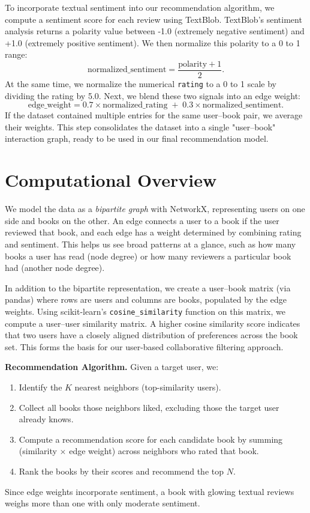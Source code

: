 \documentclass[12pt]{article}
\begin{document}
To incorporate textual sentiment into our recommendation algorithm, we compute a sentiment score for each review using TextBlob. TextBlob's sentiment analysis returns a polarity value between -1.0 (extremely negative sentiment) and +1.0 (extremely positive sentiment). We then normalize this polarity to a 0 to 1 range:
\[
\text{normalized\_sentiment} = \frac{\text{polarity} + 1}{2}.
\]
At the same time, we normalize the numerical \texttt{rating} to a 0 to 1 scale by dividing the rating by 5.0. Next, we blend these two signals into an edge weight:
\[
\text{edge\_weight} = 0.7 \times \text{normalized\_rating} \;+\; 0.3 \times \text{normalized\_sentiment}.
\]
If the dataset contained multiple entries for the same user--book pair, we average their weights. This step consolidates the dataset into a single "user--book" interaction graph, ready to be used in our final recommendation model.

\section{Computational Overview}

We model the data as a \textit{bipartite graph} with NetworkX, representing users on one side and books on the other. An edge connects a user to a book if the user reviewed that book, and each edge has a weight determined by combining rating and sentiment. This helps us see broad patterns at a glance, such as how many books a user has read (node degree) or how many reviewers a particular book had (another node degree).

In addition to the bipartite representation, we create a user--book matrix (via pandas) where rows are users and columns are books, populated by the edge weights. Using scikit-learn's \texttt{cosine\_similarity} function on this matrix, we compute a user--user similarity matrix. A higher cosine similarity score indicates that two users have a closely aligned distribution of preferences across the book set. This forms the basis for our user-based collaborative filtering approach.

\textbf{Recommendation Algorithm.} Given a target user, we:
\begin{enumerate}
    \item Identify the $K$ nearest neighbors (top-similarity users).
    \item Collect all books those neighbors liked, excluding those the target user already knows.
    \item Compute a recommendation score for each candidate book by summing (similarity $\times$ edge weight) across neighbors who rated that book.
    \item Rank the books by their scores and recommend the top $N$.
\end{enumerate}
Since edge weights incorporate sentiment, a book with glowing textual reviews weighs more than one with only moderate sentiment.
\end{document}

